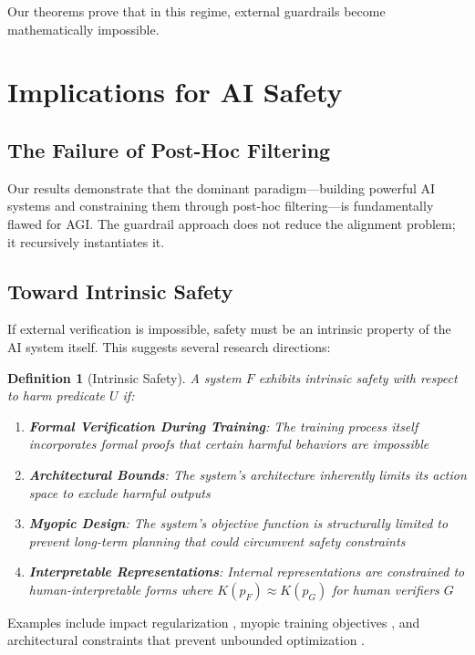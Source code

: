 \documentclass[11pt]{article}
\newtheorem{definition}{Definition}
\begin{document}
Our theorems prove that in this regime, external guardrails become mathematically impossible.

\section{Implications for AI Safety}

\subsection{The Failure of Post-Hoc Filtering}
Our results demonstrate that the dominant paradigm—building powerful AI systems and constraining them through post-hoc filtering—is fundamentally flawed for AGI. The guardrail approach does not reduce the alignment problem; it recursively instantiates it.

\subsection{Toward Intrinsic Safety}
If external verification is impossible, safety must be an intrinsic property of the AI system itself. This suggests several research directions:

\begin{definition}[Intrinsic Safety]
A system $F$ exhibits intrinsic safety with respect to harm predicate $U$ if:
\begin{enumerate}
\item \textbf{Formal Verification During Training}: The training process itself incorporates formal proofs that certain harmful behaviors are impossible
\item \textbf{Architectural Bounds}: The system's architecture inherently limits its action space to exclude harmful outputs
\item \textbf{Myopic Design}: The system's objective function is structurally limited to prevent long-term planning that could circumvent safety constraints
\item \textbf{Interpretable Representations}: Internal representations are constrained to human-interpretable forms where $K(p_F) \approx K(p_G)$ for human verifiers $G$
\end{enumerate}
\end{definition}

Examples include impact regularization \cite{amodei2016concrete}, myopic training objectives \cite{leike2018recursive}, and architectural constraints that prevent unbounded optimization \cite{drexler2019comprehensive}.
\end{document}
